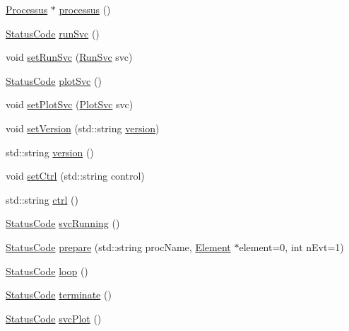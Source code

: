 \begin{DoxyCompactItemize}
\item 
\hyperlink{classProcessus}{Processus} $\ast$ \hyperlink{classApplication_a8d0918e800a5de01795bc2669d74ed82}{processus} ()
\item 
\hyperlink{classStatusCode}{Status\+Code} \hyperlink{classApplication_abfbf40397efe6ff0627d2ce1a55381ce}{run\+Svc} ()
\item 
void \hyperlink{classApplication_a95ea0ef35377c259687752aedc4b9321}{set\+Run\+Svc} (\hyperlink{Application_8h_a59643f52f9391fa83f137814aaae27ef}{Run\+Svc} svc)
\item 
\hyperlink{classStatusCode}{Status\+Code} \hyperlink{classApplication_a6344c22495ff3e87d77d0c47aea3bf00}{plot\+Svc} ()
\item 
void \hyperlink{classApplication_ac11402510105adf9a9ccf3daa25ea7d4}{set\+Plot\+Svc} (\hyperlink{Application_8h_abaa10d33ca2837dfcf8ba9bff40cdbb6}{Plot\+Svc} svc)
\item 
void \hyperlink{classApplication_a48ecc3d76b3f2390ae1ba76d13f8bd54}{set\+Version} (std\+::string \hyperlink{classApplication_a060ac7b6d3a6cb111a9ed39bfd0350d1}{version})
\item 
std\+::string \hyperlink{classApplication_a060ac7b6d3a6cb111a9ed39bfd0350d1}{version} ()
\item 
void \hyperlink{classApplication_a451a04a80f59a76fb13b6fae6c07439a}{set\+Ctrl} (std\+::string control)
\item 
std\+::string \hyperlink{classApplication_a3eb11c9a1985a3a9d2ec51df957f7c2f}{ctrl} ()
\item 
\hyperlink{classStatusCode}{Status\+Code} \hyperlink{classApplication_a35eca6b5e618b508a0736d032e2a9203}{svc\+Running} ()
\item 
\hyperlink{classStatusCode}{Status\+Code} \hyperlink{classApplication_a61dcc20b7f4b7c19b697db7516a62afa}{prepare} (std\+::string proc\+Name, \hyperlink{classElement}{Element} $\ast$element=0, int n\+Evt=1)
\item 
\hyperlink{classStatusCode}{Status\+Code} \hyperlink{classApplication_ab38055646202ef49c9ee2eda6d48076f}{loop} ()
\item 
\hyperlink{classStatusCode}{Status\+Code} \hyperlink{classApplication_a1a36a06d48d94a9a8fdc29a77d2cb9f0}{terminate} ()
\item 
\hyperlink{classStatusCode}{Status\+Code} \hyperlink{classApplication_a297f55c288c32cbdadadcbbc26ae7692}{svc\+Plot} ()
\end{DoxyCompactItemize}
